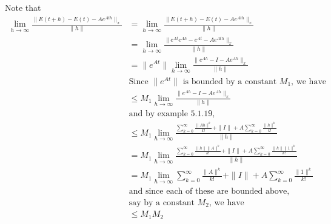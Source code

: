 \documentclass[letterpaper,12pt]{article}
\theoremstyle{definition}
\begin{document}
Note that
\begin{align*}
    \lim_{h \to \infty} \frac{\|E(t+h) - E(t) - Ae^{Ath}\|_x}{\|h\|} &= \lim_{h \to \infty} \frac{\|E(t+h) - E(t) - Ae^{Ath}\|_x}{\|h\|} \\
    &= \lim_{h \to \infty} \frac{\|e^{At}e^{Ah} - e^{At}- Ae^{Ath}\|_x}{\|h\|} \\
    &=\|e^{At}\| \lim_{h \to \infty} \frac{\|e^{Ah} - I - Ae^{Ah}\|_x}{\|h\|} \\
    &\text{Since $\|e^{At}\|$ is bounded by a constant $M_1$, we have} \\
    &\leq M_1 \lim_{h \to \infty} \frac{\|e^{Ah} - I - Ae^{Ah}\|_x}{\|h\|} \\
    &\text{and by example 5.1.19,}\\
    &\leq M_1 \lim_{h \to \infty} \frac{\sum^{\infty}_{k = 0} \frac{\|Ah\|^k}{k!}  + \|I\| + A \sum^{\infty}_{k = 0} \frac{\|h\|^k}{k!}}{\|h\|} \\
    &= M_1 \lim_{h \to \infty} \frac{\sum^{\infty}_{k = 0} \frac{\|h\|\|A\|^k}{k!}  + \|I\| + A \sum^{\infty}_{k = 0} \frac{\|h\|\|1\|^k}{k!}}{\|h\|} \\
    &= M_1 \lim_{h \to \infty} \sum^{\infty}_{k = 0} \frac{\|A\|^k}{k!}  + \|I\| + A \sum^{\infty}_{k = 0} \frac{\|1\|^k}{k!} \\
    &\text{and since each of these are bounded above,}\\&\text{say by a constant $M_2$, we have}\\
    &\leq M_1 M_2 
\end{align*}
\end{document}
